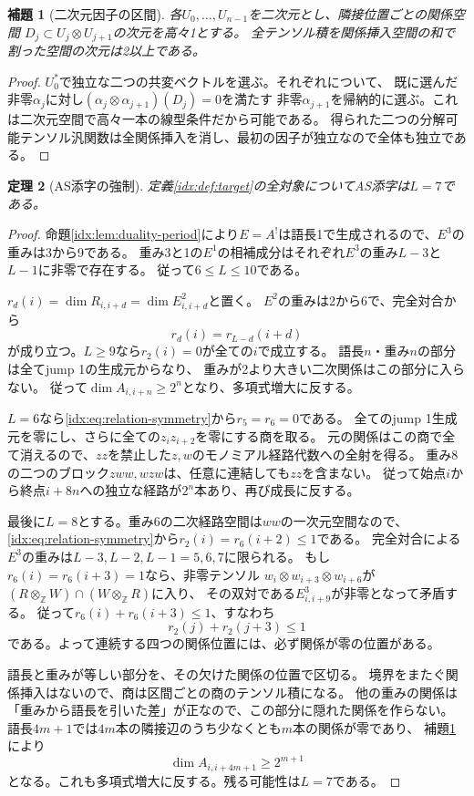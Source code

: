 \documentclass[11pt,a4paper]{ltjsarticle}
\newtheorem{theorem}{定理}[section]
\newtheorem{lemma}[theorem]{補題}
\theoremstyle{definition}
\begin{document}
\begin{lemma}[二次元因子の区間]\label{idx:lem:segment}
各$U_0,\ldots,U_{n-1}$を二次元とし、隣接位置ごとの関係空間
$D_j\subset U_j\otimes U_{j+1}$の次元を高々1とする。
全テンソル積を関係挿入空間の和で割った空間の次元は2以上である。
\end{lemma}
\begin{proof}
$U_0^*$で独立な二つの共変ベクトルを選ぶ。それぞれについて、
既に選んだ非零$\alpha_j$に対し$(\alpha_j\otimes\alpha_{j+1})(D_j)=0$を満たす
非零$\alpha_{j+1}$を帰納的に選ぶ。これは二次元空間で高々一本の線型条件だから可能である。
得られた二つの分解可能テンソル汎関数は全関係挿入を消し、最初の因子が独立なので全体も独立である。
\end{proof}

\begin{theorem}[AS添字の強制]\label{idx:thm:index-seven}
定義\ref{idx:def:target}の全対象についてAS添字は$L=7$である。
\end{theorem}
\begin{proof}
命題\ref{idx:lem:duality-period}により$E=A^!$は語長1で生成されるので、$E^3$の重みは3から9である。
重み3と1の$E^1$の相補成分はそれぞれ$E^3$の重み$L-3$と$L-1$に非零で存在する。
従って$6\leq L\leq10$である。

$r_d(i)=\dim R_{i,i+d}=\dim E^2_{i,i+d}$と置く。
$E^2$の重みは2から6で、完全対合から
\begin{equation}\label{idx:eq:relation-symmetry}
r_d(i)=r_{L-d}(i+d)
\end{equation}
が成り立つ。$L\geq9$なら$r_2(i)=0$が全ての$i$で成立する。
語長$n$・重み$n$の部分は全てjump 1の生成元からなり、
重みが2より大きい二次関係はこの部分に入らない。
従って$\dim A_{i,i+n}\geq2^n$となり、多項式増大に反する。

$L=6$なら\eqref{idx:eq:relation-symmetry}から$r_5=r_6=0$である。
全てのjump 1生成元を零にし、さらに全ての$z_i z_{i+2}$を零にする商を取る。
元の関係はこの商で全て消えるので、$zz$を禁止した$z,w$のモノミアル経路代数への全射を得る。
重み8の二つのブロック$zww,wzw$は、任意に連結しても$zz$を含まない。
従って始点$i$から終点$i+8n$への独立な経路が$2^n$本あり、再び成長に反する。

最後に$L=8$とする。重み6の二次経路空間は$ww$の一次元空間なので、
\eqref{idx:eq:relation-symmetry}から$r_2(i)=r_6(i+2)\leq1$である。
完全対合による$E^3$の重みは$L-3,L-2,L-1=5,6,7$に限られる。
もし$r_6(i)=r_6(i+3)=1$なら、非零テンソル
$w_i\otimes w_{i+3}\otimes w_{i+6}$が
$(R\otimes_{\mathbb Z}W)\cap(W\otimes_{\mathbb Z}R)$に入り、
その双対である$E^3_{i,i+9}$が非零となって矛盾する。
従って$r_6(i)+r_6(i+3)\leq1$、すなわち
\[
r_2(j)+r_2(j+3)\leq1
\]
である。よって連続する四つの関係位置には、必ず関係が零の位置がある。

語長と重みが等しい部分を、その欠けた関係の位置で区切る。
境界をまたぐ関係挿入はないので、商は区間ごとの商のテンソル積になる。
他の重みの関係は「重みから語長を引いた差」が正なので、この部分に隠れた関係を作らない。
語長$4m+1$では$4m$本の隣接辺のうち少なくとも$m$本の関係が零であり、
補題\ref{idx:lem:segment}により
\[
\dim A_{i,i+4m+1}\geq2^{m+1}
\]
となる。これも多項式増大に反する。残る可能性は$L=7$である。
\end{proof}
\end{document}
